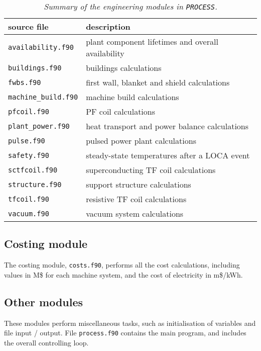 \documentclass[11pt,a4paper]{report}
\newcommand{\process}{\mbox{\texttt{PROCESS}}}
\begin{document}
\begin{table}[tbph]
\begin{center}

\begin{tabular}{||l||l||} \hline
source file     & description \\ \hline
\texttt{availability.f90} & plant component lifetimes and overall availability \\
\texttt{buildings.f90} & buildings calculations \\
\texttt{fwbs.f90} & first wall, blanket and shield calculations \\
\texttt{machine\_build.f90} & machine build calculations \\
\texttt{pfcoil.f90} & PF coil calculations \\
\texttt{plant\_power.f90} & heat transport and power balance calculations \\
\texttt{pulse.f90} & pulsed power plant calculations \\
\texttt{safety.f90} & steady-state temperatures after a LOCA event \\
\texttt{sctfcoil.f90} & superconducting TF coil calculations \\
\texttt{structure.f90} & support structure calculations \\
\texttt{tfcoil.f90} & resistive TF coil calculations \\
\texttt{vacuum.f90} & vacuum system calculations \\
\hline
\end{tabular}
\end{center}
\caption[Summary of engineering modules]
{\label{tab:engineering}
  \textit{Summary of the engineering modules in \process.}
}
\end{table}

\subsection{Costing module}

The costing module, \texttt{costs.f90}, performs all the cost calculations,
including values in M\$ for each machine system, and the cost of electricity
in m\$/kWh.

\subsection{Other modules}

These modules perform miscellaneous tasks, such as initialisation of variables
and file input / output. File \texttt{process.f90} contains the main program,
and includes the overall controlling loop.
\end{document}
